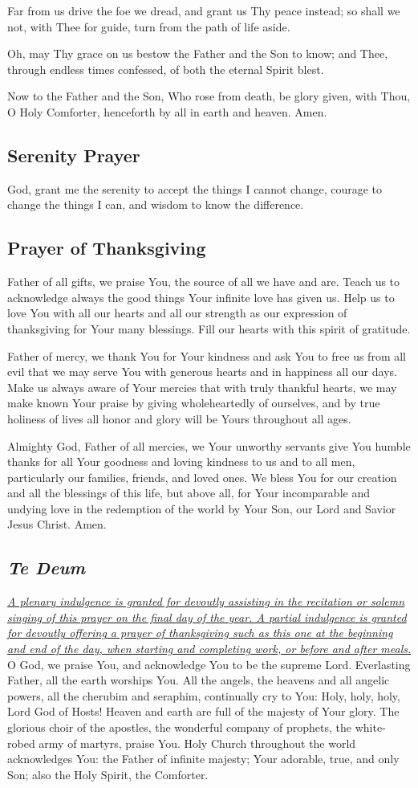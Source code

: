 \documentclass[12pt]{article}
\newcommand{\prayertitle}[1]{\subsection{#1}}
\newcommand{\indulgencedprayertitle}[1]{\prayertitle{#1 \protect\kreuz}}
\newcommand{\foreign}[1]{\textsl{#1}}
\newcommand{\note}[1]{{\small{\textsl{#1}}}\newline}
\newcommand{\linkednote}[2]{\hyperlink{#1}{\note{#2}}}
\begin{document}
Far from us drive the foe we dread,
and grant us Thy peace instead;
so shall we not, with Thee for guide,
turn from the path of life aside.

Oh, may Thy grace on us bestow
the Father and the Son to know;
and Thee, through endless times confessed,
of both the eternal Spirit blest.

Now to the Father and the Son,
Who rose from death, be glory given,
with Thou, O Holy Comforter,
henceforth by all in earth and heaven.
Amen.

\prayertitle{Serenity Prayer}
God, grant me the serenity to accept the things I cannot change,
courage to change the things I can,
and wisdom to know the difference.

\prayertitle{Prayer of Thanksgiving}
Father of all gifts, we praise You, the source of all we have and are.
Teach us to acknowledge always the good things Your infinite love has given us.
Help us to love You with all our hearts and all our strength as our expression of thanksgiving for Your many blessings.
Fill our hearts with this spirit of gratitude.

Father of mercy, we thank You for Your kindness and ask You to free us from all evil that we may serve You with generous hearts and in happiness all our days.
Make us always aware of Your mercies that with truly thankful hearts, we may make known Your praise by giving wholeheartedly of ourselves, and by true holiness of lives all honor and glory will be Yours throughout all ages.

Almighty God, Father of all mercies, we Your unworthy servants give You humble thanks for all Your goodness and loving kindness to us and to all men, particularly our families, friends, and loved ones.
We bless You for our creation and all the blessings of this life, but above all, for Your incomparable and undying love in the redemption of the world by Your Son, our Lord and Savior Jesus Christ.
Amen.

\indulgencedprayertitle{\foreign{Te Deum}}
\linkednote{grant26}{A plenary indulgence is granted for devoutly assisting in the recitation or solemn singing of this prayer on the final day of the year.
A partial indulgence is granted for devoutly offering a prayer of thanksgiving such as this one at the beginning and end of the day, when starting and completing work, or before and after meals.}
O God, we praise You, and acknowledge You to be the supreme Lord.
Everlasting Father, all the earth worships You.
All the angels, the heavens and all angelic powers, all the cherubim and seraphim, continually cry to You:
Holy, holy, holy, Lord God of Hosts!
Heaven and earth are full of the majesty of Your glory.
The glorious choir of the apostles, the wonderful company of prophets, the white-robed army of martyrs, praise You.
Holy Church throughout the world acknowledges You:
the Father of infinite majesty;
Your adorable, true, and only Son;
also the Holy Spirit, the Comforter.
\end{document}
